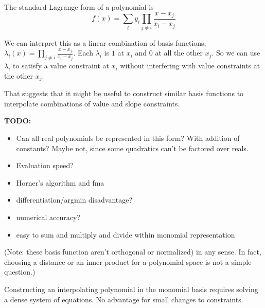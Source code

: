 \restoregeometry
\label{sec:Lagrange-basis}

The standard Lagrange\cite{wiki:Lagrange-polynomial}
form of a polynomial  is
\begin{equation}
f(x) = \sum_{i} y_i \prod_{j \neq i} \frac{x - x_j}{x_i -x_j}
\end{equation}

We can interpret this as a linear combination of basis functions,
$\lambda_i (x) = \prod_{j \neq i} \frac{x - x_j}{x_i -x_j}$.
Each $\lambda_i$ is $1$ at $x_i$ and $0$ at all the other $x_j$.
So we can use $\lambda_i$ to satisfy a value constraint at $x_i$
without interfering with value constraints at the other $x_j$.

That suggests that it might be useful to construct similar basis
functions to interpolate combinations of value and slope 
constraints.

\textbf{TODO:} 
\begin{itemize}
  \item Can all real polynomials be represented in this form? 
        With addition of constants? Maybe not, since some
        quadratics can't be factored over reals.
  \item Evaluation speed?
  \item Horner's algorithm and fma
  \item differentiation/argmin disadvantage?
  \item numerical accuracy?
  \item easy to sum and multiply and divide within monomial
  representation
\end{itemize}

(Note: these basis function aren't orthogonal or normalized)
in any
sense. In fact, choosing a distance or an inner product for
a polynomial space is not a simple question.)

Constructing an interpolating polynomial in the monomial basis
requires solving a dense system of equations. 
No advantage for small changes to constraints.



